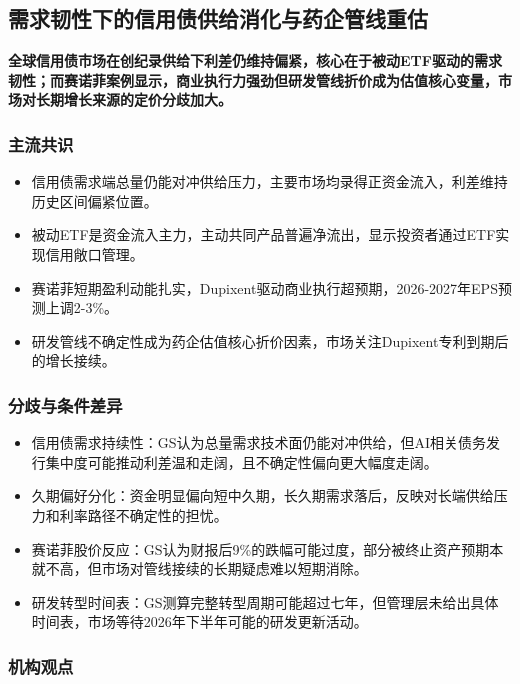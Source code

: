\documentclass[11pt]{ctexart}
\begin{document}
\subsection{需求韧性下的信用债供给消化与药企管线重估}
\textbf{全球信用债市场在创纪录供给下利差仍维持偏紧，核心在于被动ETF驱动的需求韧性；而赛诺菲案例显示，商业执行力强劲但研发管线折价成为估值核心变量，市场对长期增长来源的定价分歧加大。}
\subsubsection*{主流共识}
\begin{itemize}
  \item 信用债需求端总量仍能对冲供给压力，主要市场均录得正资金流入，利差维持历史区间偏紧位置。
  \item 被动ETF是资金流入主力，主动共同产品普遍净流出，显示投资者通过ETF实现信用敞口管理。
  \item 赛诺菲短期盈利动能扎实，Dupixent驱动商业执行超预期，2026-2027年EPS预测上调2-3\%。
  \item 研发管线不确定性成为药企估值核心折价因素，市场关注Dupixent专利到期后的增长接续。
\end{itemize}
\subsubsection*{分歧与条件差异}
\begin{itemize}
  \item 信用债需求持续性：GS认为总量需求技术面仍能对冲供给，但AI相关债务发行集中度可能推动利差温和走阔，且不确定性偏向更大幅度走阔。
  \item 久期偏好分化：资金明显偏向短中久期，长久期需求落后，反映对长端供给压力和利率路径不确定性的担忧。
  \item 赛诺菲股价反应：GS认为财报后9\%的跌幅可能过度，部分被终止资产预期本就不高，但市场对管线接续的长期疑虑难以短期消除。
  \item 研发转型时间表：GS测算完整转型周期可能超过七年，但管理层未给出具体时间表，市场等待2026年下半年可能的研发更新活动。
\end{itemize}
\subsubsection*{机构观点}
\end{document}

